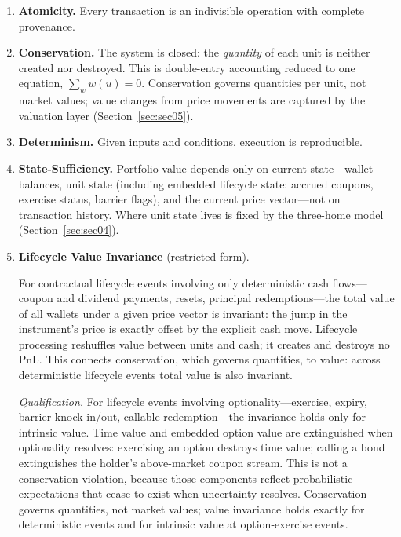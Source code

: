 \begin{enumerate}
\item \textbf{Atomicity.} Every transaction is an indivisible operation with complete provenance.

\item \textbf{Conservation.} The system is closed: the \emph{quantity} of each unit is neither created nor destroyed. This is double-entry accounting reduced to one equation, $\sum_w w(u) = 0$. Conservation governs quantities per unit, not market values; value changes from price movements are captured by the valuation layer (Section~\ref{sec:sec05}).

\item \textbf{Determinism.} Given inputs and conditions, execution is reproducible.

\item \textbf{State-Sufficiency.} Portfolio value depends only on current state---wallet balances, unit state (including embedded lifecycle state: accrued coupons, exercise status, barrier flags), and the current price vector---not on transaction history. Where unit state lives is fixed by the three-home model (Section~\ref{sec:sec04}).

\item \textbf{Lifecycle Value Invariance} (restricted form). \label{prop:lifecycle-value-invariance} {\setlength{\emergencystretch}{2em}For contractual lifecycle events involving only deterministic cash flows---\allowbreak coupon and dividend payments, resets, principal redemptions---\allowbreak the total value of all wallets under a given price vector is invariant: the jump in the instrument's price is exactly offset by the explicit cash move. Lifecycle processing reshuffles value between units and cash; it creates and destroys no PnL. This connects conservation, which governs quantities, to value: across deterministic lifecycle events total value is also invariant.\par}

\textit{Qualification.} For lifecycle events involving optionality---exercise, expiry, barrier knock-in/out, callable redemption---the invariance holds only for intrinsic value. Time value and embedded option value are extinguished when optionality resolves: exercising an option destroys time value; calling a bond extinguishes the holder's above-market coupon stream. This is not a conservation violation, because those components reflect probabilistic expectations that cease to exist when uncertainty resolves. Conservation governs quantities, not market values; value invariance holds exactly for deterministic events and for intrinsic value at option-exercise events.


\end{enumerate}
